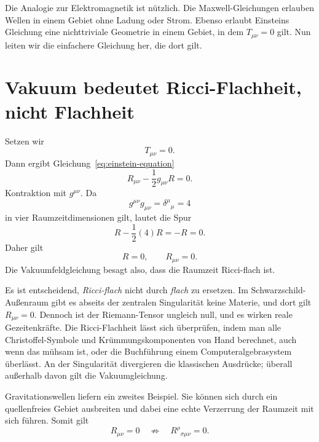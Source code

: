 Die Analogie zur Elektromagnetik ist nützlich. Die Maxwell-Gleichungen erlauben Wellen in einem Gebiet ohne Ladung oder Strom. Ebenso erlaubt Einsteins Gleichung eine nichttriviale Geometrie in einem Gebiet, in dem \(T_{\mu\nu}=0\) gilt. Nun leiten wir die einfachere Gleichung her, die dort gilt.

\section{Vakuum bedeutet Ricci-Flachheit, nicht Flachheit}

Setzen wir
\begin{equation}
 T_{\mu\nu}=0.
\end{equation}
Dann ergibt Gleichung~\eqref{eq:einstein-equation}
\begin{equation}
 R_{\mu\nu}-\frac12g_{\mu\nu}R=0.
 \label{eq:vacuum-einstein}
\end{equation}
Kontraktion mit \(g^{\mu\nu}\). Da
\begin{equation}
 g^{\mu\nu}g_{\mu\nu}
 =\delta^\mu{}_\mu=4
\end{equation}
in vier Raumzeitdimensionen gilt, lautet die Spur
\begin{equation}
 R-\frac12(4)R=-R=0.
\end{equation}
Daher gilt
\begin{equation}
 R=0,
 \qquad
 R_{\mu\nu}=0.
 \label{eq:ricci-flat}
\end{equation}
Die Vakuumfeldgleichung besagt also, dass die Raumzeit Ricci-flach ist.

Es ist entscheidend, \emph{Ricci-flach} nicht durch \emph{flach} zu ersetzen. Im Schwarzschild-Außenraum gibt es abseits der zentralen Singularität keine Materie, und dort gilt \(R_{\mu\nu}=0\). Dennoch ist der Riemann-Tensor ungleich null, und es wirken reale Gezeitenkräfte. Die Ricci-Flachheit lässt sich überprüfen, indem man alle Christoffel-Symbole und Krümmungskomponenten von Hand berechnet, auch wenn das mühsam ist, oder die Buchführung einem Computeralgebrasystem überlässt. An der Singularität divergieren die klassischen Ausdrücke; überall außerhalb davon gilt die Vakuumgleichung.

Gravitationswellen liefern ein zweites Beispiel. Sie können sich durch ein quellenfreies Gebiet ausbreiten und dabei eine echte Verzerrung der Raumzeit mit sich führen. Somit gilt
\begin{equation}
 R_{\mu\nu}=0
 \quad\not\Rightarrow\quad
 R^\rho{}_{\sigma\mu\nu}=0.
\end{equation}

